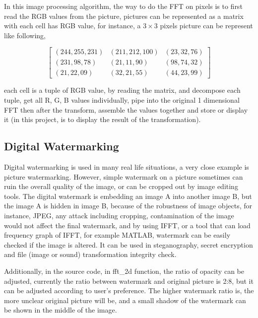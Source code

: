 \documentclass[12pt]{article}
\begin{document}
			In this image processing algorithm, the way to do the FFT on pixels is to first read the RGB values from the picture, pictures can be represented as a matrix with each cell has RGB value, for instance, a $3 \times 3$ pixels picture can be represent like following,
			
			\begin{center}
				\centering
				\[
				\begin{bmatrix}
					(244, 255, 231) & (211, 212, 100) & (23, 32, 76)\\
					(231, 98, 78) & (21, 11, 90) & (98, 74, 32)\\
					(21, 22, 09) & (32, 21, 55) & (44, 23, 99)
				\end{bmatrix}
				\]
			\end{center}
		
			each cell is a tuple of RGB value, by reading the matrix, and decompose each tuple, get all R, G, B values individually, pipe into the original 1 dimensional FFT then after the transform, assemble the values together and store or display it (in this project, is to display the result of the transformation).
		\subsection{Digital Watermarking}
			Digital watermarking is used in many real life situations, a very close example is picture watermarking. However, simple watermark on a picture sometimes can ruin the overall quality of the image, or can be cropped out by image editing tools. The digital watermark is embedding an image A into another image B, but the image A is hidden in image B, because of the robustness of image objects, for instance, JPEG, any attack including cropping, contamination of the image would not affect the final watermark, and by using IFFT, or a tool that can load frequency graph of IFFT, for example MATLAB, watermark can be easily checked if the image is altered. It can be used in steganography, secret encryption and file (image or sound) transformation integrity check.
			
			Additionally, in the source code, in fft\_2d function, the ratio of opacity can be adjusted, currently the ratio between watermark and original picture is 2:8, but it can be adjusted according to user's preference. The higher watermark ratio is, the more unclear original picture will be, and a small shadow of the watermark can be shown in the middle of the image.
			
		
\end{document}
